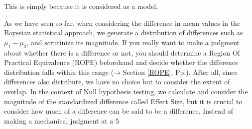 \documentclass{ltjsbook}
\begin{document}
This is simply because it is considered as a model.

As we have seen so far, when considering the difference in mean values in the Bayesian statistical approach, we generate a distribution of differences such as $\mu_1 - \mu_2$, and scrutinize its magnitude. If you really want to make a judgment about whether there is a difference or not, you should determine a Region Of Practical Equivalence (ROPE) beforehand and decide whether the difference distribution falls within this range (→ Section \ref{ROPE}, Pp.\pageref{ROPE}). After all, since differences also distribute, we have no choice but to consider the extent of overlap. In the context of Null hypothesis testing, we calculate and consider the magnitude of the standardized difference called Effect Size, but it is crucial to consider how much of a difference can be said to be a difference. Instead of making a mechanical judgment at a 5%
\end{document}

